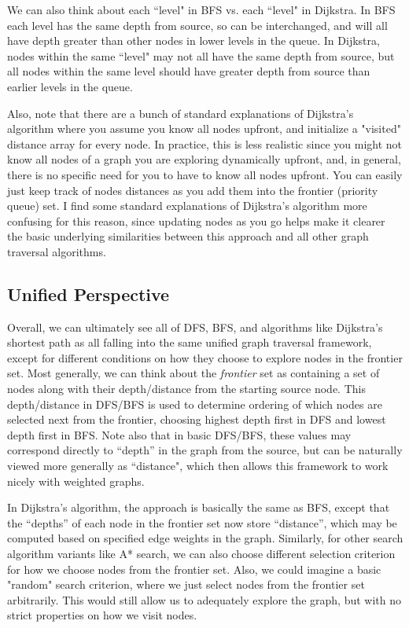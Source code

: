 \documentclass[10pt,a4paper]{article}
\begin{document}
We can also think about each ``level" in BFS vs. each ``level" in Dijkstra. In BFS each level has the same depth from source, so can be interchanged, and will all have depth greater than other nodes in lower levels in the queue. In Dijkstra, nodes within the same ``level" may not all have the same depth from source, but all nodes within the same level should have greater depth from source than earlier levels in the queue.

Also, note that there are a bunch of standard explanations of Dijkstra's algorithm where you assume you know all nodes upfront, and initialize a "visited" distance array for every node. In practice, this is less realistic since you might not know all nodes of a graph you are exploring dynamically upfront, and, in general, there is no specific need for you to have to know all nodes upfront. You can easily just keep track of nodes distances as you add them into the frontier (priority queue) set. I find some standard explanations of Dijkstra's algorithm more confusing for this reason, since updating nodes as you go helps make it clearer the basic underlying similarities between this approach and all other graph traversal algorithms.

\subsection{Unified Perspective}

Overall, we can ultimately see all of DFS, BFS, and algorithms like Dijkstra's shortest path as all falling into the same unified graph traversal framework, except for different conditions on how they choose to explore nodes in the frontier set. Most generally, we can think about the \textit{frontier} set as containing a set of nodes along with their depth/distance from the starting source node. This depth/distance in DFS/BFS is used to determine ordering of which nodes are selected next from the frontier, choosing highest depth first in DFS and lowest depth first in BFS. Note also that in basic DFS/BFS, these values may correspond directly to ``depth'' in the graph from the source, but can be naturally viewed more generally as ``distance", which then allows this framework to work nicely with weighted graphs. 

In Dijkstra's algorithm, the approach is basically the same as BFS, except that the ``depths'' of each node in the frontier set now store ``distance'', which may be computed based on specified edge weights in the graph. Similarly, for other search algorithm variants like A* search, we can also choose different selection criterion for how we choose nodes from the frontier set. Also, we could imagine a basic "random" search criterion, where we just select nodes from the frontier set arbitrarily. This would still allow us to adequately explore the graph, but with no strict properties on how we visit nodes.
\end{document}
